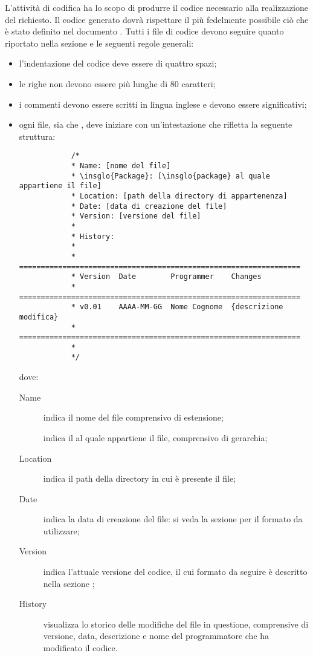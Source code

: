  \label{sec:codifica}
L'attività di codifica ha lo scopo di produrre il codice necessario alla realizzazione del  richiesto. Il codice generato dovrà rispettare il più fedelmente possibile ciò che è stato definito nel documento .
	Tutti i file di codice devono seguire quanto riportato nella sezione  e le seguenti regole generali:
	\begin{itemize}
		\item l'indentazione del codice deve essere di quattro spazi;
		\item le righe non devono essere più lunghe di 80 caratteri;
		\item i commenti devono essere scritti in lingua inglese e devono essere significativi;
		\item ogni file, sia  che , deve iniziare con un'intestazione che rifletta la seguente struttura:
		\begin{lstlisting}
			/*
			* Name: [nome del file]
			* \insglo{Package}: [\insglo{package} al quale appartiene il file]
			* Location: [path della directory di appartenenza]
			* Date: [data di creazione del file]
			* Version: [versione del file]
			* 
			* History:
			* 
			* =================================================================
			* Version  Date        Programmer    Changes
			* =================================================================
			* v0.01    AAAA-MM-GG  Nome Cognome  {descrizione modifica}
			* =================================================================
			*
			*/
		\end{lstlisting}
		dove:
		\begin{description}
			\item[Name] indica il nome del file comprensivo di estensione;
			\item[] indica il  al quale appartiene il file, comprensivo di gerarchia;
			\item[Location] indica il path della directory in cui è presente il file;
			\item[Date] indica la data di creazione del file: si veda la sezione  per il formato da utilizzare;
			\item[Version] indica l'attuale versione del codice, il cui formato da seguire è descritto nella sezione ;
			\item[History] visualizza lo storico delle modifiche del file in questione, comprensive di versione, data, descrizione e nome del programmatore che ha modificato il codice.
		\end{description}
	\end{itemize}
